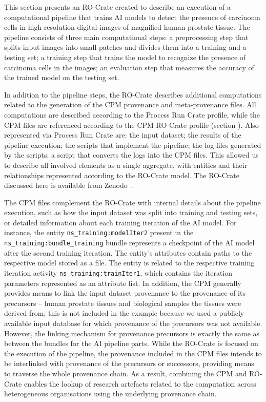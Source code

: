 \documentclass[10pt,letterpaper]{article}
\begin{document}
This section presents an RO-Crate created to describe an execution of a computational pipeline that trains AI models to detect the presence of carcinoma cells in high-resolution digital images of magnified human prostate tissue.
The pipeline consists of three main computational steps: a preprocessing step that splits input images into small patches and divides them into a training and a testing set; a training step that trains the model to recognize the presence of carcinoma cells in the images; an evaluation step that measures the accuracy of the trained model on the testing set.

In addition to the pipeline steps, the RO-Crate describes additional computations related to the generation of the CPM provenance and meta-provenance files.
All computations are described according to the Process Run Crate profile, while the CPM files are referenced according to the CPM RO-Crate profile (section ).
Also represented via Process Run Crate are: the input dataset; the results of the pipeline execution; the scripts that implement the pipeline; the log files generated by the scripts; a script that converts the logs into the CPM files.
This allowed us to describe all involved elements as a single aggregate, with entities and their relationships represented according to the RO-Crate model.
The RO-Crate discussed here is available from Zenodo~\cite{Wittner 2023}.

The CPM files complement the RO-Crate with internal details about the pipeline execution, such as how the input dataset was split into training and testing sets, or detailed information about each training iteration of the AI model.
For instance, the entity \texttt{ns\_training:modelIter2} present in the \texttt{ns\_training:bundle\_training} bundle represents a checkpoint of the AI model after the second training iteration.
The entity's attributes contain paths to the respective model stored as a file.
The entity is related to the respective training iteration activity \texttt{ns\_training:trainIter1}, which contains the iteration parameters represented as an attribute list.
In addition, the CPM generally provides means to link the input dataset provenance to the provenance of its precursors -- human prostate tissues and biological samples the tissues were derived from; this is not included in the example because we used a publicly available input database for which provenance of the precursors was not available.
However, the linking mechanism for provenance precursors is exactly the same as between the bundles for the AI pipeline parts.
While the RO-Crate is focused on the execution of the pipeline, the provenance included in the CPM files intends to be interlinked with provenance of the precursors or successors, providing means to traverse the whole provenance chain.
As a result, combining the CPM and RO-Crate enables the lookup of research artefacts related to the computation across heterogeneous organisations using the underlying provenance chain.
\end{document}
